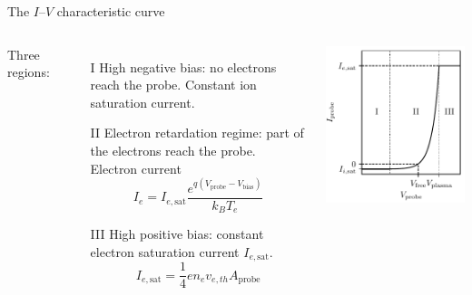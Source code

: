 \documentclass[10pt]{beamer}
\newcommand{\electronsaturationcurrent}[0]{\ensuremath{I_{e,{\mathrm{sat}}}}}
\newcommand{\biasvoltage}{\ensuremath{V_{\mathrm{bias}}}}
\newcommand{\probevoltage}{\ensuremath{V_{\mathrm{probe}}}}
\begin{document}
\begin{frame}{The $I$--$V$ characteristic curve}
    \begin{columns}
        Three regions:
        \begin{enumerate}
            \item[I] High negative bias: no electrons reach the probe. Constant ion saturation current.
            \item[II] Electron retardation regime: part of the electrons reach the probe. Electron current 
            \begin{equation*}
                I_e = \electronsaturationcurrent \frac{e^{q(\probevoltage - \biasvoltage)}}{k_B T_e}
            \end{equation*}
            \item[III] High positive bias: constant electron saturation current $\electronsaturationcurrent$.
            \begin{equation*}
                \electronsaturationcurrent = \frac{1}{4}e n_e v_{e,th} A_{\mathrm{probe}}
            \end{equation*}
        \end{enumerate}
        \includegraphics[scale=1]{../figures/langmuir_characteristic.pdf}
    \end{columns}
\end{frame}
\end{document}
